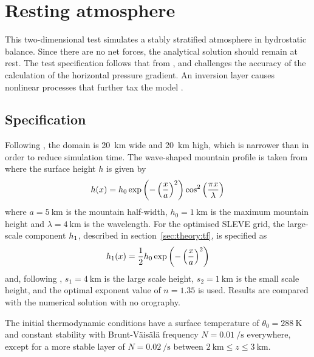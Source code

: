 \section{Resting atmosphere}
\label{sec:resting}

This two-dimensional test simulates a stably stratified atmosphere in hydrostatic balance.  Since there are no net forces, the analytical solution should remain at rest.  The test specification follows that from \textcite{klemp2011}, and challenges the accuracy of the calculation of the horizontal pressure gradient.  An inversion layer causes nonlinear processes that further tax the model \autocite{good2013}.

\subsection{Specification}
Following \textcite{weller-shahrokhi2014}, the domain is \SI{20}{\kilo\meter} wide and \SI{20}{\kilo\meter} high, which is narrower than \textcite{klemp2011} in order to reduce simulation time.  The wave-shaped mountain profile is taken from \textcite{schaer2002} where the surface height $h$ is given by
\begin{align}
	h(x) = h_0 \exp \left( - \left( \frac{x}{a} \right)^2 \right) \cos^2 \left( \frac{\pi x}{\lambda} \right) \label{eqn:resting:mountain}
\end{align}
where $a = \SI{5}{\kilo\meter}$ is the mountain half-width, $h_0 = \SI{1}{\kilo\meter}$ is the maximum mountain height and $\lambda = \SI{4}{\kilo\meter}$ is the wavelength.  For the optimised SLEVE grid, the large-scale component $h_1$, described in section~\ref{sec:theory:tf}, is specified as
\begin{align}
h_1(x) = \frac{1}{2} h_0 \exp \left( - \left( \frac{x}{a} \right)^2 \right)
\end{align}
and, following \cite{leuenberger2010}, $s_1 = \SI{4}{\kilo\meter}$ is the large scale height, $s_2 = \SI{1}{\kilo\meter}$ is the small scale height, and the optimal exponent value of $n = 1.35$ is used.  Results are compared with the numerical solution with no orography.

The initial thermodynamic conditions have a surface temperature of $\theta_0 = \SI{288}{\kelvin}$ and constant stability with Brunt-V\"ais\"al\"a frequency $N = \SI{0.01}{\per\second}$ everywhere, except for a more stable layer of $N = \SI{0.02}{\per\second}$ between $\SI{2}{\kilo\meter} \leq z \leq \SI{3}{\kilo\meter}$.

